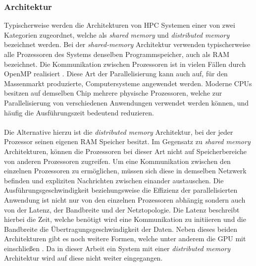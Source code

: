 \subsubsection{Architektur}
Typischerweise werden die Architekturen von \ac{HPC} Systemen einer von zwei Kategorien zugeordnet, welche als \emph{shared memory} und \emph{distributed memory} bezeichnet werden. Bei der \emph{shared-memory} Architektur verwenden typischerweise alle Prozessoren des Systems denselben Programmspeicher, auch als \ac{RAM} bezeichnet. Die Kommunikation zwischen Prozessoren ist in vielen Fällen durch \ac{OpenMP} realisiert \cite{nielsen2016introduction}. Diese Art der Parallelisierung kann auch auf, für den Massenmarkt produzierte, Computersysteme angewendet werden. Moderne \acp{CPU} besitzen auf demselben Chip mehrere physische Prozessoren, welche zur Parallelisierung von verschiedenen Anwendungen verwendet werden können, und häufig die Ausführungszeit bedeutend reduzieren. 
\\\\
Die Alternative hierzu ist die \emph{distributed memory} Architektur, bei der jeder Prozessor seinen eigenen \ac{RAM} Speicher besitzt. Im Gegensatz zu \emph{shared memory} Architekturen, können die Prozessoren bei dieser Art nicht auf Speicherbereiche von anderen Prozessoren zugreifen. Um eine Kommunikation zwischen den einzelnen Prozessoren zu ermöglichen, müssen sich diese in demselben Netzwerk befinden und expliziten Nachrichten zwischen einander austauschen. Die Ausführungsgeschwindigkeit beziehungsweise die Effizienz der parallelisierten Anwendung ist nicht nur von den einzelnen Prozessoren abhängig sondern auch von der Latenz, der Bandbreite und der Netztopologie. Die Latenz beschreibt hierbei die Zeit, welche benötigt wird eine Kommunikation zu initiieren und die Bandbreite die Übertragungsgeschwindigkeit der Daten. Neben dieses beiden Architekturen gibt es noch weitere Formen, welche unter anderem die \ac{GPU} mit einschließen \cite{nielsen2016introduction}. Da in dieser Arbeit ein System mit einer \emph{distributed memory} Architektur wird auf diese nicht weiter eingegangen.

